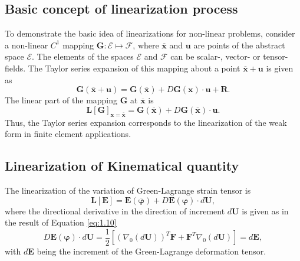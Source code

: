 \documentclass[11pt,a4paper,final]{article}
\begin{document}
\subsection{\textbf{Basic concept of linearization process}}
To demonstrate the basic idea of linearizations for non-linear problems, consider a non-linear $C^1$ mapping $\mathbf{G}: \mathcal{E} \mapsto \mathcal{F}$, where $\overline{\mathbf{x}}$ and $\mathbf{u}$ are points of the abstract space $\mathcal{E}$. The elements of the spaces $\mathcal{E}$ and $\mathcal{F}$ can be scalar-, vector- or tensor-fields. The Taylor series expansion of this mapping about a point $\overline{\mathbf{x}} + \mathbf{u}$ is given as
\begin{equation}
\mathbf{G}(\overline{\mathbf{x}} + \mathbf{u}) = \mathbf{G}(\overline{\mathbf{x}}) + D \mathbf{G}(\mathbf{x}) \cdot \mathbf{u} + \mathbf{R}.
\end{equation}
The linear part of the mapping $\mathbf{G}$ at $\overline{\mathbf{x}}$ is 
\begin{equation}
\mathbf{L} \left[ \mathbf{G} \right]_{\mathbf{x} = \overline{\mathbf{x}}} = \mathbf{G}(\overline{\mathbf{x}}) + D \mathbf{G}(\overline{\mathbf{x}}) \cdot \mathbf{u}.
\end{equation} 
Thus, the Taylor series expansion corresponds to the linearization of the weak form in finite element applications. 
\subsection{\textbf{Linearization of Kinematical quantity}}
The linearization of the variation of Green-Lagrange strain tensor is 
\begin{equation}
\mathbf{L}\left[ \mathbf{E} \right] = \mathbf{E}(\overline{\bm{\varphi}}) + D \mathbf{E}(\bm{\varphi}) \cdot d \mathbf{U},
\label{eq:1.17}
\end{equation}
where the directional derivative in the direction of increment $d \mathbf{U}$ is given as in the result of Equation \eqref{eq:1.10}
\begin{equation}
D \mathbf{E}(\bm{\varphi}) \cdot d\mathbf{U} = \dfrac{1}{2} \left[ (\nabla_0 (d\mathbf{U}))^T \mathbf{F} + \mathbf{F}^T \nabla_0 (d\mathbf{U}) \right] = d \mathbf{E},
\label{eq:1.18}
\end{equation}
with $d\mathbf{E}$ being the increment of the Green-Lagrange deformation tensor.
\end{document}
